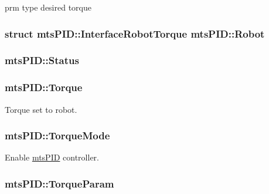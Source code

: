 prm type desired torque 

\hypertarget{classmts_p_i_d_a17e9ab759f0051e59244d3a211ba6791}{
\subsubsection[{Robot}]{\setlength{\rightskip}{0pt plus 5cm}struct {\bf mts\-P\-I\-D\-::\-Interface\-Robot\-Torque}  mts\-P\-I\-D\-::\-Robot\hspace{0.3cm}{\ttfamily [protected]}}}\label{classmts_p_i_d_a17e9ab759f0051e59244d3a211ba6791}
\hypertarget{classmts_p_i_d_ad1821194105cd685d56442e1b94fb13d}{
\subsubsection[{Status}]{ mts\-P\-I\-D\-::\-Status}}\label{classmts_p_i_d_ad1821194105cd685d56442e1b94fb13d}
\hypertarget{classmts_p_i_d_a928a19f9bc0b311ec5743a108b2f8534}{
\subsubsection[{Torque}]{ mts\-P\-I\-D\-::\-Torque\hspace{0.3cm}{\ttfamily [protected]}}}\label{classmts_p_i_d_a928a19f9bc0b311ec5743a108b2f8534}


Torque set to robot. 

\hypertarget{classmts_p_i_d_a7bd7ccfcdc69d5d5b91087f019c01c63}{
\subsubsection[{Torque\-Mode}]{ mts\-P\-I\-D\-::\-Torque\-Mode\hspace{0.3cm}{\ttfamily [protected]}}}\label{classmts_p_i_d_a7bd7ccfcdc69d5d5b91087f019c01c63}


Enable \hyperlink{classmts_p_i_d}{mts\-P\-I\-D} controller. 

\hypertarget{classmts_p_i_d_a5aab0504bce1d2293bfbbc2eeec3f1f9}{
\subsubsection[{Torque\-Param}]{ mts\-P\-I\-D\-::\-Torque\-Param\hspace{0.3cm}{\ttfamily [protected]}}}\label{classmts_p_i_d_a5aab0504bce1d2293bfbbc2eeec3f1f9}


